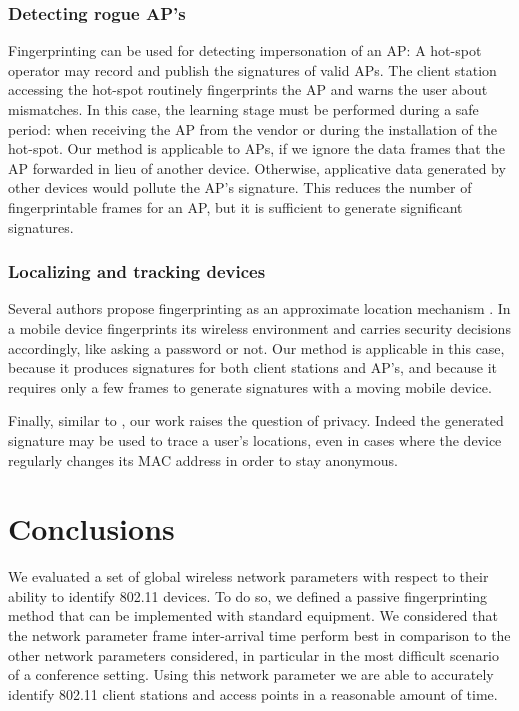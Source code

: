 \documentclass[10pt, conference, compsocconf, letterpaper]{IEEEtran}
\begin{document}
\subsubsection{Detecting rogue AP's}
\label{sec:appAP}







Fingerprinting can be used for detecting impersonation of an AP: 
A hot-spot operator may record and publish the signatures of valid APs. 
The client station accessing the hot-spot routinely fingerprints the AP and warns the user about mismatches.
In this case, the learning stage must be performed during a safe period: when receiving the AP from the vendor or during the installation of the hot-spot.
Our method is applicable to APs, if we ignore the data frames that the AP forwarded in lieu of another device.
Otherwise, applicative data generated by other devices would pollute the AP's signature.
This reduces the number of fingerprintable frames for an AP, but it is sufficient to
generate significant signatures.


\subsubsection{Localizing and tracking devices} 
Several authors propose fingerprinting as an approximate location mechanism \cite{AmbiantSensing,SurroundSense}.
In \cite{AmbiantSensing} a mobile device fingerprints its wireless environment and carries security decisions accordingly, 
like asking a password or not.
Our method is applicable in this case, because it produces signatures for both client stations and AP's, 
and because it requires only a few frames to generate signatures with a moving mobile device.

Finally, similar to \cite{Pang:Mobicom}, our work raises the question of privacy. Indeed the generated
signature may be used to trace a user's locations, even in cases where the device regularly 
changes its MAC address in order to stay anonymous. 










\section{Conclusions}
\label{sec:conclusion}

We evaluated a set of global wireless network parameters with respect to their ability to identify 802.11 devices.
To do so, we defined a passive fingerprinting method that can be implemented with standard equipment. 
We considered that the network parameter frame inter-arrival time perform best in comparison to the other network parameters considered, in particular in the most difficult scenario of a conference setting.
Using this network parameter we are able to accurately identify 802.11 client stations and access points in a reasonable amount of time.
\end{document}
